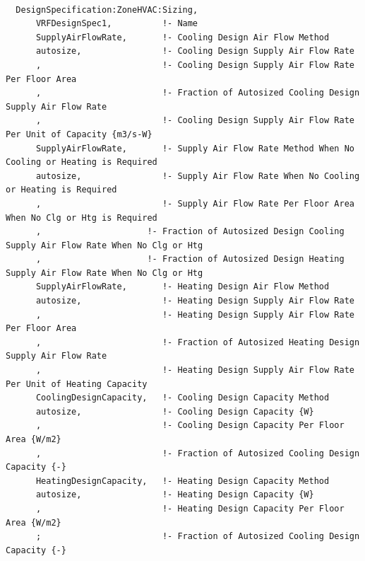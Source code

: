 \begin{lstlisting}

  DesignSpecification:ZoneHVAC:Sizing,
      VRFDesignSpec1,          !- Name
      SupplyAirFlowRate,       !- Cooling Design Air Flow Method
      autosize,                !- Cooling Design Supply Air Flow Rate
      ,                        !- Cooling Design Supply Air Flow Rate Per Floor Area
      ,                        !- Fraction of Autosized Cooling Design Supply Air Flow Rate
      ,                        !- Cooling Design Supply Air Flow Rate Per Unit of Capacity {m3/s-W}
      SupplyAirFlowRate,       !- Supply Air Flow Rate Method When No Cooling or Heating is Required
      autosize,                !- Supply Air Flow Rate When No Cooling or Heating is Required
      ,                        !- Supply Air Flow Rate Per Floor Area When No Clg or Htg is Required
      ,                     !- Fraction of Autosized Design Cooling Supply Air Flow Rate When No Clg or Htg
      ,                     !- Fraction of Autosized Design Heating Supply Air Flow Rate When No Clg or Htg
      SupplyAirFlowRate,       !- Heating Design Air Flow Method
      autosize,                !- Heating Design Supply Air Flow Rate
      ,                        !- Heating Design Supply Air Flow Rate Per Floor Area
      ,                        !- Fraction of Autosized Heating Design Supply Air Flow Rate
      ,                        !- Heating Design Supply Air Flow Rate Per Unit of Heating Capacity
      CoolingDesignCapacity,   !- Cooling Design Capacity Method
      autosize,                !- Cooling Design Capacity {W}
      ,                        !- Cooling Design Capacity Per Floor Area {W/m2}
      ,                        !- Fraction of Autosized Cooling Design Capacity {-}
      HeatingDesignCapacity,   !- Heating Design Capacity Method
      autosize,                !- Heating Design Capacity {W}
      ,                        !- Heating Design Capacity Per Floor Area {W/m2}
      ;                        !- Fraction of Autosized Cooling Design Capacity {-}


\end{lstlisting}
